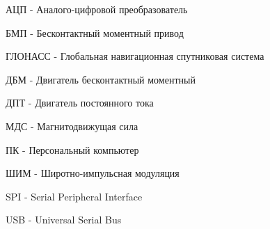\abb

\noindent
АЦП - Аналого-цифровой преобразователь

\noindent
БМП - Бесконтактный моментный привод

\noindent
ГЛОНАСС - Глобальная навигационная спутниковая система

\noindent
ДБМ - Двигатель бесконтактный моментный

\noindent
ДПТ - Двигатель постоянного тока

\noindent
МДС - Магнитодвижущая сила

\noindent
ПК - Персональный компьютер

\noindent
ШИМ - Широтно-импульсная модуляция

\noindent
SPI - Serial Peripheral Interface

\noindent
USB - Universal Serial Bus